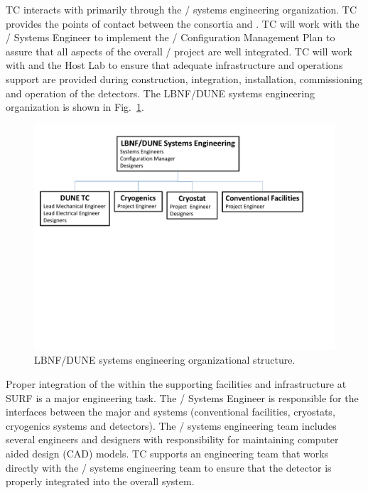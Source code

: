  TC interacts with  primarily through the
/ systems engineering organization. TC
provides the points of contact between the consortia and .
TC will work with the / Systems Engineer to
implement the / Configuration Management Plan
to assure that all aspects of the overall /
project are well integrated. TC will work with  and the
Host Lab to ensure that adequate infrastructure and operations support
are provided during construction, integration, installation,
commissioning and operation of the detectors. The LBNF/DUNE systems
engineering organization is shown in Fig.~\ref{fig:DUNE_SE_org}.
\begin{figure}[htb]
  \begin{center}
    \includegraphics[width=\textwidth]{far-detector-generic/figures/TC_SE_Org_Chart}
    \caption{LBNF/DUNE systems engineering organizational structure.}
    \label{fig:DUNE_SE_org}
  \end{center}
\end{figure}
Proper integration of the  within the supporting
facilities and infrastructure at SURF is a major engineering task.
The / Systems Engineer is responsible for the
interfaces between the major  and  systems
(conventional facilities, cryostats, cryogenics systems and
detectors). The / systems engineering team
includes several engineers and designers with responsibility for
maintaining computer aided design (CAD) models.  TC
supports an engineering team that works directly with the
/ systems engineering team to ensure that the
detector is properly integrated into the overall system.

